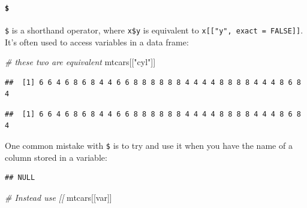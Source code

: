 \documentclass[
]{book}
\newenvironment{Shaded}{\begin{snugshade}}{\end{snugshade}}
\newcommand{\CommentTok}[1]{\textcolor[rgb]{0.56,0.35,0.01}{\textit{#1}}}
\newcommand{\NormalTok}[1]{#1}
\newcommand{\OtherTok}[1]{\textcolor[rgb]{0.56,0.35,0.01}{#1}}
\newcommand{\SpecialCharTok}[1]{\textcolor[rgb]{0.81,0.36,0.00}{\textbf{#1}}}
\newcommand{\StringTok}[1]{\textcolor[rgb]{0.31,0.60,0.02}{#1}}
\begin{document}
\paragraph{\texorpdfstring{\texttt{\$}}{\$}}\label{section-1}

\texttt{\$} is a shorthand operator, where \texttt{x\$y} is equivalent to \texttt{x{[}{[}"y",\ exact\ =\ FALSE{]}{]}}. It's often used to access variables in a data frame:

\begin{Shaded}
\begin{Highlighting}[]
\CommentTok{\# these two are equivalent}
\NormalTok{mtcars[[}\StringTok{"cyl"}\NormalTok{]]}
\end{Highlighting}
\end{Shaded}

\begin{verbatim}
##  [1] 6 6 4 6 8 6 8 4 4 6 6 8 8 8 8 8 8 4 4 4 4 8 8 8 8 4 4 4 8 6 8 4
\end{verbatim}

\begin{Shaded}
\end{Shaded}

\begin{verbatim}
##  [1] 6 6 4 6 8 6 8 4 4 6 6 8 8 8 8 8 8 4 4 4 4 8 8 8 8 4 4 4 8 6 8 4
\end{verbatim}

One common mistake with \texttt{\$} is to try and use it when you have the name of a column stored in a variable:

\begin{Shaded}
\end{Shaded}

\begin{verbatim}
## NULL
\end{verbatim}

\begin{Shaded}
\begin{Highlighting}[]
\CommentTok{\# Instead use [[}
\NormalTok{mtcars[[var]]}
\end{Highlighting}
\end{Shaded}
\end{document}
